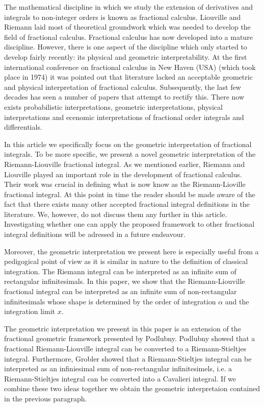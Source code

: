 \documentclass{article}
\theoremstyle{theorem}
\theoremstyle{definition}
\begin{document}
The mathematical discipline in which we study the extension of derivatives and integrals to non-integer orders is known as fractional calculus. Liouville and Riemann laid most 
of theoretical groundwork which was needed to develop the field of fractional calculus. Fractional calculus has now developed into a mature discipline. 
However, there is one aspect of the discipline which only started to develop fairly recently: its physical and geometric interpretability. At the first international conference on fractional calculus in
New Haven (USA) (which took place in 1974) it was pointed out that literature lacked an acceptable geometric and physical interpretation of fractional calculus. Subsequently, the last few decades has seen 
a number of papers that attempt to rectify this. There now exists probabilistic interpretations, geometric interpretations, physical interpretations and ecenomic 
interpretations of fractional order integrals and differentials. 

In this article we specifically focus on the geometric interpretation of fractional integrals. To be more specific, we present a novel geometric interpretation of the Riemann-Liouville fractional integral.
As we mentioned earlier, Riemann and Liouville played an important role in the development of fractional calculus. Their work was crucial in defining what is now know as 
the Riemann-Lioville fractional integral. At this point in time the reader should be made aware of the fact that there exists many other accepted fractional integral definitions in the literature.
We, however, do not discuss them any further in this article. Investigating whether one can apply the proposed framework to other fractional integral definitions will be adressed in a 
future endeavour.

Moreover, the geometric interpretation we present here is especially useful from a pedigogical point of view as it is similar in nature to the definition of classical integration. The Riemann integral 
can be interpreted as an infinite sum of rectangular infinitesimals. In this paper, we show that the Riemann-Liouville fractional integral can be interpreted 
as an infinite sum of non-rectangular infinitesimals whose shape is determined by the order of integration $\alpha$ and the integration limit $x$. 

The geometric interpretation we present in this paper is an extension of the fractional geometric framework presented by Podlubny. Podlubny showed that a fractional Riemann-Liouville 
integral can be converted to a Riemann-Stieltjes integral. Furthermore, Grobler showed that a Riemann-Stieltjes integral can be interpreted as an infiniesimal sum of 
non-rectangular infinitesimels, i.e. a Riemann-Stieltjes integral can be converted into a Cavalieri integral. If we combine these two ideas together we obtain the geometric interpretaion contained in the 
previous paragraph.  
\end{document}
